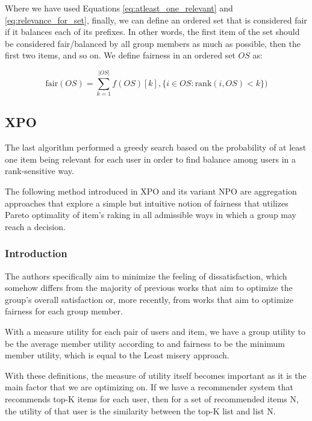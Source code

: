 Where we have used Equations \ref{eq:atleast_one_relevant} and \ref{eq:relevance_for_set}, finally, we can define an ordered set that is considered fair if it balances each of its prefixes. In other words, the first item of the set should be considered fair/balanced by all group members as much as possible, then the first two items, and so on. We define fairness in an ordered set $OS$ as:

\begin{equation}
    \textrm{fair}(OS) = \sum_{k=1}^{|OS|}{f(OS)[k], \{i \in OS : \textrm{rank}(i, OS) < k\})}
\end{equation}




\subsection{XPO} \label{subsec:03_advanced_methods.xpo}
The last algorithm performed a greedy search based on the probability of at least one item being relevant for each user in order to find balance among users in a rank-sensitive way.

The following method introduced in \cite{sacharidis_2019_top_n_with_fairness} XPO and its variant NPO are aggregation approaches that explore a simple but intuitive notion of fairness that utilizes Pareto optimality of item's raking in all admissible ways in which a group may reach a decision.

\subsubsection{Introduction}
The authors specifically aim to minimize the feeling of dissatisfaction, which somehow differs from the majority of previous works that aim to optimize the group's overall satisfaction or, more recently, from works that aim to optimize fairness for each group member.

With a measure utility for each pair of users and item, we have a group utility to be the average member utility according to \cite{social_welfare} and fairness to be the minimum member utility, which is equal to the Least misery approach.

With these definitions, the measure of utility itself becomes important as it is the main factor that we are optimizing on. If we have a recommender system that recommends top-K items for each user, then for a set of recommended items N, the utility of that user is the similarity between the top-K list and list N.

